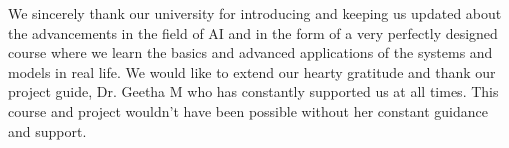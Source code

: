 

\begin{acknowledgements}      %
	We sincerely thank our university for introducing and keeping us updated about the advancements in the field of AI and in the form of a very perfectly designed course where we learn the basics and advanced applications of the systems and models in real life. We would like to extend our hearty gratitude and thank our project guide, Dr. Geetha M who has constantly supported us at all times. This course and project wouldn’t have been possible without her constant guidance and support.

\end{acknowledgements}








